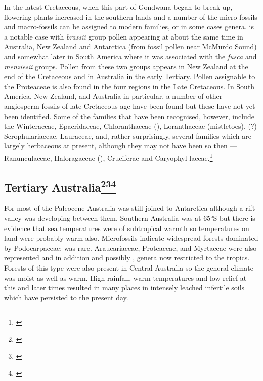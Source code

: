 In the latest Cretaceous, when this part of Gondwana began to break up, flowering plants increased in the southern lands and a number of the micro-fossils and macro-fossils can be assigned to modern families, or in some cases genera.
 is a notable case with \emph{brassii} group pollen appearing at about the same time in Australia, New Zealand and Antarctica (from fossil pollen near McMurdo Sound) and somewhat later in South America where it was associated with the \emph{fusca} and \emph{menziesii} groups.
Pollen from these two groups appears in New Zealand at the end of the Cretaceous and in Australia in the early Tertiary.
Pollen assignable to the Proteaceae is also found in the four regions in the Late Cretaceous.
In South America, New Zealand, and Australia in particular, a number of other angiosperm fossils of late Cretaceous age have been found but these have not yet been identified.
Some of the families that have been recognised, however, include the Winteraceae, Epacridaceae, Chloranthaceae (), Loranthaceae (mistletoes), (?) Scrophulariaceae, Lauraceae, and, rather surprisingly, several families which are largely herbaceous at present, although they may not have been so then --- Ranunculaceae, Haloragaceae (), Cruciferae and Caryophyl-laceae.\footnote{\cite{mildenhall1980new}}

\subsection[Tertiary Australia]{Tertiary Australia\thinspace\footnote{\cite{kemp1978tertiary}}\footnote{\cite{martin1981tertiary}}\footnote{\cite{smith1982history}}}

For most of the Paleocene Australia was still joined to Antarctica although a rift valley was developing between them.
Southern Australia was at \ang{65}S but there is evidence that sea temperatures were of subtropical warmth so temperatures on land were probably warm also.
Microfossils indicate widespread forests dominated by Podocarpaceae;  was rare.
Araucariaceae, Proteaceae, and Myrtaceae were also represented and in addition  and possibly , genera now restricted to the tropics.
Forests of this type were also present in Central Australia so the general climate was moist as well as warm.
High rainfall, warm temperatures and low relief at this and later times resulted in many places in intensely leached infertile soils which have persisted to the present day.

